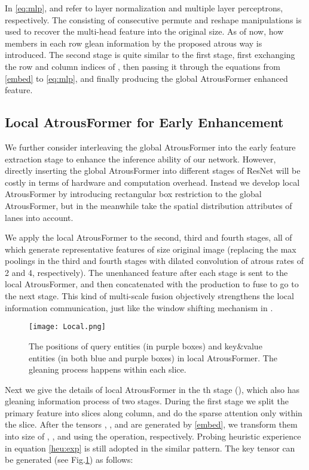 \documentclass[preprint,12pt,review]{elsarticle}
\begin{document}
In \eqref{eq:mlp},  and  refer to layer normalization and multiple layer perceptrons, respectively. The  consisting of consecutive permute and reshape manipulations is used to recover the multi-head feature into the original size. As of now, how members in each row glean information by the proposed atrous way is introduced. The second stage is quite similar to the first stage, first exchanging the row and column indices of , then passing it through the equations from \eqref{embed} to \eqref{eq:mlp}, and finally producing the global AtrousFormer enhanced feature.

\subsection{Local AtrousFormer for Early Enhancement}
We further consider interleaving the global AtrousFormer into the early feature extraction stage to enhance the inference ability of our network. However, directly inserting the global AtrousFormer into different stages of ResNet will be costly in terms of hardware and computation overhead. Instead we develop local AtrousFormer by introducing rectangular box restriction to the global AtrousFormer, but in the meanwhile take the spatial distribution attributes of lanes into account. 

We apply the local AtrousFormer to the second, third and fourth stages, all of which generate representative features of size  original image (replacing the max poolings in the third and fourth stages with dilated convolution of atrous rates of 2 and 4, respectively). The unenhanced feature after each stage is sent to the local AtrousFormer, and then concatenated with the production to fuse to go to the next stage. This kind of multi-scale fusion objectively strengthens the local information communication, just like the window shifting mechanism in \cite{swin}. 

\begin{figure}[tbp]
	\centering
	\texttt{[image: Local.png]}
	\caption{The positions of query entities (in purple boxes) and key\&value entities (in both blue and purple boxes) in local AtrousFormer. The gleaning process happens within each slice.}
	\label{fig:att1}
\end{figure}

Next we give the details of local AtrousFormer in the th stage (), which also has gleaning information process of two stages. During the first stage we split the primary feature into  slices along column, and do the sparse attention only within the slice. After the tensors , , and  are generated by \eqref{embed}, we transform them into size of , , and  using the  operation, respectively. Probing heuristic experience in equation \eqref{heu:exp}  is still adopted in the similar pattern.
The key tensor can be generated (see Fig.\ref{fig:att1}) as follows:
\end{document}
